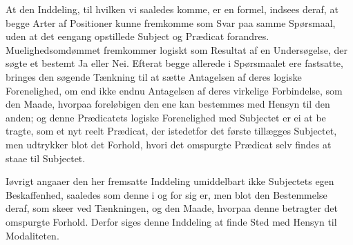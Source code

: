 \documentclass[12pt]{book}
\def\textit#1{#1}%
\def\emph#1{#1}%
\newcommand{\opage}[1]{\marginnote{\footnotesize\textit{[#1]}}}
\begin{document}
At den Inddeling, til hvilken vi saaledes komme, er en formel, indsees deraf, at begge
Arter af Positioner kunne fremkomme som Svar paa samme Spørsmaal, uden at det eengang
opstillede Subject og Prædicat forandres. Muelighedsomdømmet fremkommer logiskt som
Resultat af en Undersøgelse, der søgte et bestemt Ja eller Nei. Efterat begge allerede i
Spørsmaalet ere fastsatte, bringes den søgende Tænkning til at sætte Antagelsen af deres
\emph{logiske Forenelighed}, om end ikke endnu Antagelsen af deres \emph{virkelige
Forbindelse}, som den Maade, hvorpaa foreløbigen den ene kan bestemmes med Hensyn til den
anden; og denne Prædicatets \emph{logiske Forenelighed} med Subjectet er ei at be%
\opage{283}tragte, som et nyt reelt Prædicat, der istedetfor det første tillægges Subjectet, men
udtrykker blot det Forhold, hvori det omspurgte Prædicat selv findes at staae til Subjectet.

Iøvrigt angaaer den her fremsatte Inddeling umiddelbart ikke Subjectets egen Beskaffenhed,
saaledes som denne i og for sig er, men blot den Bestemmelse deraf, som skeer ved
Tænkningen, og den Maade, hvorpaa denne betragter det omspurgte Forhold. Derfor siges denne
Inddeling at finde Sted med Hensyn til \emph{Modaliteten}.
\end{document}
